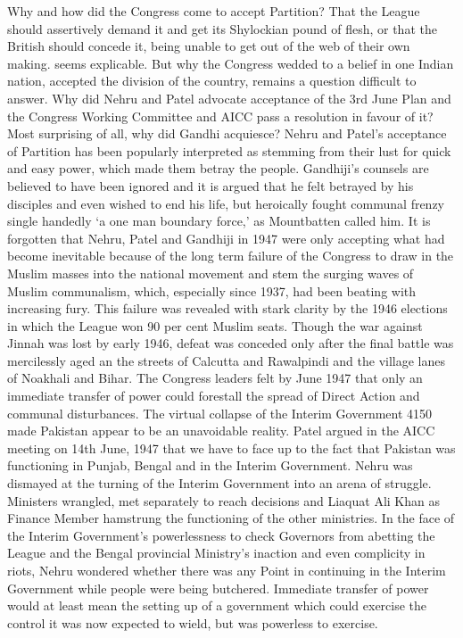 Why and how did the Congress come to accept Partition? That the League should assertively demand it and get its Shylockian pound of flesh, or that the British should concede it, being unable to get out of the web of their own making. seems explicable. But why the Congress wedded to a belief in one Indian nation, accepted the division of the country, remains a question difficult to answer. Why did Nehru and Patel advocate acceptance of the 3rd June Plan and the Congress Working Committee and AICC pass a resolution in favour of it? Most surprising of all, why did Gandhi acquiesce? Nehru and Patel's acceptance of Partition has been popularly interpreted as stemming from their lust for quick and easy power, which made them betray the people. Gandhiji's counsels are believed to have been ignored and it is argued that he felt betrayed by his disciples and even wished to end his life, but heroically fought communal frenzy single­ handedly `a one man boundary force,' as Mountbatten called him. It is forgotten that Nehru, Patel and Gandhiji in 1947 were only accepting what had become inevitable because of the long­ term failure of the Congress to draw in the Muslim masses into the national movement and stem the surging waves of Muslim communalism, which, especially since 1937, had been beating with increasing fury. This failure was revealed with stark clarity by the 1946 elections in which the League won 90 per cent Muslim seats. Though the war against Jinnah was lost by early 1946, defeat was conceded only after the final battle was mercilessly aged an the streets of Calcutta and Rawalpindi and the village lanes of Noakhali and Bihar. The Congress leaders felt by June 1947 that only an immediate transfer of power could forestall the spread of Direct Action and communal disturbances. The virtual collapse of the Interim Government 4150 made Pakistan appear to be an unavoidable reality. Patel argued in the AICC meeting on 14th June, 1947 that we have to face up to the fact that Pakistan was functioning in Punjab, Bengal and in the Interim Government. Nehru was dismayed at the turning of the Interim Government into an arena of struggle. Ministers wrangled, met separately to reach decisions and Liaquat Ali Khan as Finance Member hamstrung the functioning of the other ministries. In the face of the Interim Government's powerlessness to check Governors from abetting the League and the Bengal provincial Ministry's inaction and even complicity in riots, Nehru wondered whether there was any Point in continuing in the Interim Government while people were being butchered. Immediate transfer of power would at least mean the setting up of a government which could exercise the control it was now expected to wield, but was powerless to exercise. 

